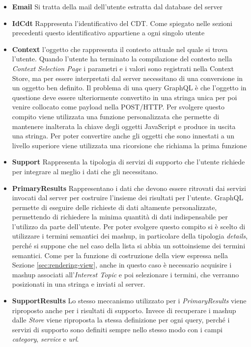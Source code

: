\begin{itemize}
	\item \textbf{Email}
	Si tratta della mail dell'utente estratta dal database del server
	\item \textbf{IdCdt}
	Rappresenta l'identificativo del CDT. Come spiegato nelle sezioni precedenti questo identificativo appartiene a ogni singolo utente
	\item \textbf{Context}
	\upe l'oggetto che rappresenta il contesto attuale nel quale si trova l'utente. Quando l'utente ha terminato la compilazione del contesto nella \emph{Context Selection Page} i parametri e i valori sono registrati nella Context Store, ma per essere interpretati dal server necessitano di una conversione in un oggetto ben definito. Il problema di una query GraphQL è che l'oggetto in questione deve essere ulteriormente convertito in una stringa unica per poi venire collocato come payload nella POST/HTTP. Per svolgere questo compito viene utilizzata una funzione personalizzata che permette di mantenere inalterata la chiave degli oggetti JavaScript e produce in uscita una stringa. Per poter convertire anche gli oggetti che sono innestati a un livello superiore viene utilizzata una ricorsione che richiama la prima funzione
	\item \textbf{Support}
	Rappresenta la tipologia di servizi di supporto che l'utente richiede per integrare al meglio i dati che gli necessitano. %
	\item \textbf{PrimaryResults}
	Rappresentano i dati che devono essere ritrovati dai servizi invocati dal server per costruire l'insieme dei risultati per l'utente. GraphQL permette di eseguire delle richieste di dati altamente personalizzate, permettendo di richiedere la minima quantità di dati indispensabile per l'utilizzo da parte dell'utente. Per poter svolgere questo compito si è scelto di utilizzare i termini semantici dei mashup, in particolare della tipologia \emph{details}, perché si suppone che nel caso della lista si abbia un sottoinsieme dei termini semantici. Come per la funzione di costruzione della view espressa nella Sezione \ref{sec:rendering-view}, anche in questo caso è necessario acquisire i mashup associati all'\emph{Interest Topic} e poi selezionare i termini, che verranno posizionati in una stringa e inviati al server.
	\item \textbf{SupportResults}
	Lo stesso meccanismo utilizzato per i \emph{PrimaryResults} viene riproposto anche per i risultati di supporto. Invece di recuperare i mashup dalle \emph{Store} viene riproposta la stessa definizione per ogni query, perché i servizi di supporto sono definiti sempre nello stesso modo con i campi \emph{category}, \emph{service} e \emph{url}.
\end{itemize}

